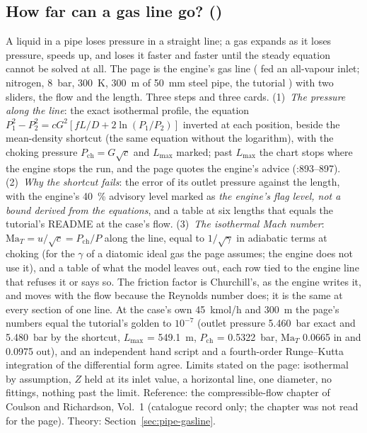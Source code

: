 \documentclass[11pt,a4paper]{article}
\begin{document}
\subsection*{How far can a gas line go? \quad()}\label{sec:edu-gas-line}
A liquid in a pipe loses pressure in a straight line; a gas expands as it loses pressure, speeds up, and loses it
faster and faster until the steady equation cannot be solved at all.  The page is the engine's gas line
( fed an all-vapour inlet; nitrogen, 8~bar, 300~K, 300~m of 50~mm steel pipe, the tutorial
) with two sliders, the flow and the length.  Three steps and three cards.
(1)~\emph{The pressure along the line}: the exact isothermal profile, the equation
$P_1^2 - P_2^2 = cG^2[fL/D + 2\ln(P_1/P_2)]$ inverted at each position, beside the mean-density shortcut (the same
equation without the logarithm), with the choking pressure $P_\mathrm{ch} = G\sqrt{c}$ and $L_\mathrm{max}$ marked;
past $L_\mathrm{max}$ the chart stops where the engine stops the run, and the page quotes the engine's advice
(:893--897).  (2)~\emph{Why the shortcut fails}: the error of its outlet pressure against the length,
with the engine's 40~\% advisory level marked as \emph{the engine's flag level, not a bound derived from the
equations}, and a table at six lengths that equals the tutorial's README at the case's flow.  (3)~\emph{The
isothermal Mach number}: $\mathrm{Ma}_T = u/\sqrt{c} = P_\mathrm{ch}/P$ along the line, equal to $1/\sqrt{\gamma}$ in
adiabatic terms at choking (for the $\gamma$ of a diatomic ideal gas the page assumes; the engine does not use it),
and a table of what the model leaves out, each row tied to the engine line that refuses it or says so.  The friction
factor is Churchill's, as the engine writes it, and moves with the flow because the Reynolds number does; it is the
same at every section of one line.  At the case's own 45~kmol/h and 300~m the page's numbers equal the tutorial's
golden to $10^{-7}$ (outlet pressure 5.460~bar exact and 5.480~bar by the shortcut, $L_\mathrm{max}$ = 549.1~m,
$P_\mathrm{ch}$ = 0.5322~bar, $\mathrm{Ma}_T$ 0.0665 in and 0.0975 out), and an independent hand script and a
fourth-order Runge--Kutta integration of the differential form agree.  Limits stated on the page: isothermal by
assumption, $Z$ held at its inlet value, a horizontal line, one diameter, no fittings, nothing past the limit.
Reference: the compressible-flow chapter of Coulson and Richardson, Vol.~1 (catalogue record only; the chapter was
not read for the page).  Theory: Section~\ref{sec:pipe-gasline}.
\end{document}
